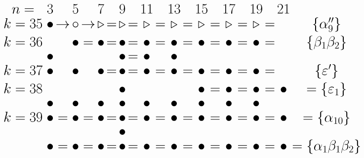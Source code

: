 \documentclass{article}
\begin{document}
\(
\begin{tikzcd}[nodes={font=\huge,inner sep=0pt},row sep=0.2cm,column sep=0.1cm]
n= & & 3 & & 5 & & 7 & & 9 & & 11 & & 13 & & 15 & & 17 && 19 && 21  \\
k=35 && \bullet &\rightarrow& \circ &\rightarrow& \triangleright &=& \triangleright &=& \triangleright &=& \triangleright &=& \triangleright  &=& \triangleright &=& \triangleright &=& & \{\alpha''_9\} \\
k=36 && && \bullet &=& \bullet &=& \bullet &=& \bullet &=& \bullet &=& \bullet &=& \bullet &=& \bullet &=&& \{\beta_1\beta_2\} \\
&& \bullet && && && \bullet &=& \bullet && \bullet \\
k=37 && \bullet && \bullet && \bullet &=& \bullet &=& \bullet &=& \bullet &=& \bullet &=& \bullet &=& \bullet &=&& \{\varepsilon'\} \\
k=38 && && && && \bullet && && && \bullet &=& \bullet &=& \bullet &=& \bullet & =\{\varepsilon_1\} \\
 && \bullet && \bullet && \bullet && \bullet && \bullet && \bullet && \bullet && \bullet && \bullet \\
k=39 && \bullet &=& \bullet &=& \bullet &=& \bullet &=& \bullet &=& \bullet &=& \bullet &=& \bullet  &=& \bullet &=& \bullet& = \{\alpha_{10}\} \\
 && && && && \bullet && && && \\
&& \bullet &=& \bullet &=& \bullet &=& \bullet &=& \bullet &=& \bullet &=& \bullet &=& \bullet  &=& \bullet &=& \bullet& = \{\alpha_{1}\beta_1\beta_2\} \\
\\
\end{tikzcd}
\)
\end{document}
